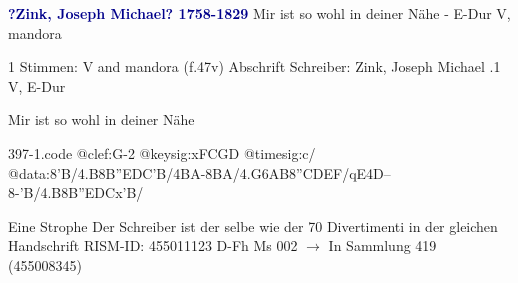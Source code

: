 \documentclass[twocolumn]{book}
\begin{document}
\newline \par \vspace{7pt} \textcolor{darkblue}{\textbf{?Zink, Joseph Michael?  1758-1829}}
\newline Mir ist so wohl in deiner Nähe - E-Dur
\newline V, mandora
\newline \begin{itshape}\end{itshape} 
\newline \textcolor{darkblue}{}  1 Stimmen: V and mandora  (f.47v)
\newline Abschrift
\newline Schreiber: Zink, Joseph Michael
.1  V, E-Dur
\newline \begin{footnotesize} Mir ist so wohl in deiner Nähe \end{footnotesize}  
\begin{filecontents*}{397-1.code}
@clef:G-2
@keysig:xFCGD
@timesig:c/
@data:8'B/4.B8B''EDC'B/4BA-{8BA}/4.G{6AB}8''CDEF/qE4D--8-'B/4.B8B''EDCx'B/
\end{filecontents*}
\newline
%
\newline Eine Strophe
\newline Der Schreiber ist der selbe wie der 70 Divertimenti in der gleichen Handschrift
\newline RISM-ID: 455011123
\newline D-Fh  Ms 002
\newline $\rightarrow$ In Sammlung 419 (455008345)
      
\end{document}
